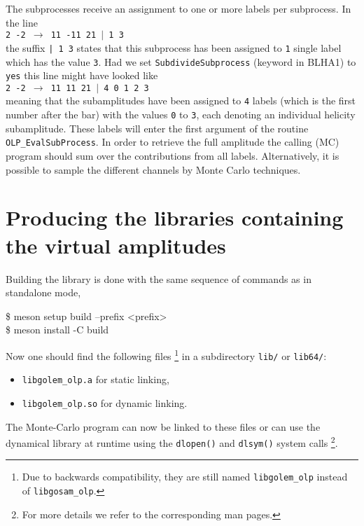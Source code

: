 The subprocesses receive an assignment to one or more
labels per subprocess. In the line\\
{\tt 2 -2 $\to$ 11 -11 21 $|$ 1 3}\\
the suffix \texttt{| 1 3}
states that this subprocess has been assigned to \texttt{1}
single label which has the value \texttt{3}. 
Had we set \texttt{SubdivideSubprocess} (keyword in BLHA1)
to \texttt{yes} this line might have looked like\\
{\tt 2 -2 $\to$ 11 11 21 $|$ 4 0 1 2 3}\\
meaning that the subamplitudes
have been assigned to
\texttt{4} labels (which is the first number after the bar) with
the values \texttt{0} to \texttt{3}, each denoting 
an individual helicity subamplitude. These labels will enter the
first argument of the routine \texttt{OLP\_EvalSubProcess}.
In order to retrieve the full amplitude the calling (MC) program should sum
over the contributions from all labels. Alternatively, it is possible to
sample the different channels by Monte Carlo techniques.

\section{Producing the libraries containing the virtual amplitudes}

Building the library is done with the same sequence of commands as in standalone mode,

\begin{example}
\$ meson setup build --prefix <prefix> \\
\$ meson install -C build
\end{example}

Now one should find the following files%
\footnote{Due to backwards compatibility, they are still named \texttt{libgolem\_olp} instead of \texttt{libgosam\_olp}.}
in a subdirectory \texttt{lib/} or \texttt{lib64/}:
\begin{itemize}
\item \texttt{libgolem\_olp.a} for static linking,
\item \texttt{libgolem\_olp.so} for dynamic linking.
\end{itemize}

The Monte-Carlo program can now be linked to these files or can
use the dynamical library at runtime using the \texttt{dlopen()} and \texttt{dlsym()} system calls%
\footnote{For more details we refer to the corresponding man pages.}.


